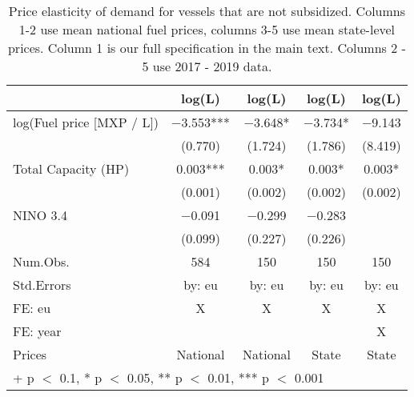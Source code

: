\begin{table}

\caption{\label{tab:}Price elasticity of demand for vessels that are not subsidized.
             Columns 1-2 use mean national fuel prices, columns 3-5 use mean state-level prices.
             Column 1 is our full specification in the main text.
             Columns 2 - 5 use 2017 - 2019 data.}
\centering
\begin{tabular}[t]{lcccc}
\toprule
  & log(L) & log(L)  & log(L)   & log(L)   \\
\midrule
log(Fuel price [MXP / L]) & \num{-3.553}*** & \num{-3.648}* & \num{-3.734}* & \num{-9.143}\\
 & (\num{0.770}) & (\num{1.724}) & (\num{1.786}) & (\num{8.419})\\
Total Capacity (HP) & \num{0.003}*** & \num{0.003}* & \num{0.003}* & \num{0.003}*\\
 & (\num{0.001}) & (\num{0.002}) & (\num{0.002}) & (\num{0.002})\\
NINO 3.4 & \num{-0.091} & \num{-0.299} & \num{-0.283} & \\
 & (\num{0.099}) & (\num{0.227}) & (\num{0.226}) & \\
\midrule
Num.Obs. & \num{584} & \num{150} & \num{150} & \num{150}\\
Std.Errors & by: eu & by: eu & by: eu & by: eu\\
FE: eu & X & X & X & X\\
FE: year &  &  &  & X\\
Prices & National & National & State & State\\
\bottomrule
\multicolumn{5}{l}{\rule{0pt}{1em}+ p $<$ 0.1, * p $<$ 0.05, ** p $<$ 0.01, *** p $<$ 0.001}\\
\end{tabular}
\end{table}

